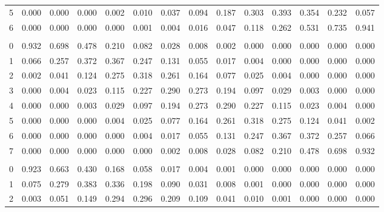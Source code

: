 \documentclass[
]{article}
\begin{document}
\begin{table}[H]
\begin{tabular}{lrrrrrrrrrrrrr}
\hspace{1em}5 & 0.000 & 0.000 & 0.000 & 0.002 & 0.010 & 0.037 & 0.094 & 0.187 & 0.303 & 0.393 & 0.354 & 0.232 & 0.057\\
\hspace{1em}6 & 0.000 & 0.000 & 0.000 & 0.000 & 0.001 & 0.004 & 0.016 & 0.047 & 0.118 & 0.262 & 0.531 & 0.735 & 0.941\\
\addlinespace[0.3em]
\multicolumn{14}{l}{$n=7$}\\
\hspace{1em}0 & 0.932 & 0.698 & 0.478 & 0.210 & 0.082 & 0.028 & 0.008 & 0.002 & 0.000 & 0.000 & 0.000 & 0.000 & 0.000\\
\hspace{1em}1 & 0.066 & 0.257 & 0.372 & 0.367 & 0.247 & 0.131 & 0.055 & 0.017 & 0.004 & 0.000 & 0.000 & 0.000 & 0.000\\
\hspace{1em}2 & 0.002 & 0.041 & 0.124 & 0.275 & 0.318 & 0.261 & 0.164 & 0.077 & 0.025 & 0.004 & 0.000 & 0.000 & 0.000\\
\hspace{1em}3 & 0.000 & 0.004 & 0.023 & 0.115 & 0.227 & 0.290 & 0.273 & 0.194 & 0.097 & 0.029 & 0.003 & 0.000 & 0.000\\
\hspace{1em}4 & 0.000 & 0.000 & 0.003 & 0.029 & 0.097 & 0.194 & 0.273 & 0.290 & 0.227 & 0.115 & 0.023 & 0.004 & 0.000\\
\hspace{1em}5 & 0.000 & 0.000 & 0.000 & 0.004 & 0.025 & 0.077 & 0.164 & 0.261 & 0.318 & 0.275 & 0.124 & 0.041 & 0.002\\
\hspace{1em}6 & 0.000 & 0.000 & 0.000 & 0.000 & 0.004 & 0.017 & 0.055 & 0.131 & 0.247 & 0.367 & 0.372 & 0.257 & 0.066\\
\hspace{1em}7 & 0.000 & 0.000 & 0.000 & 0.000 & 0.000 & 0.002 & 0.008 & 0.028 & 0.082 & 0.210 & 0.478 & 0.698 & 0.932\\
\addlinespace[0.3em]
\multicolumn{14}{l}{$n=8$}\\
\hspace{1em}0 & 0.923 & 0.663 & 0.430 & 0.168 & 0.058 & 0.017 & 0.004 & 0.001 & 0.000 & 0.000 & 0.000 & 0.000 & 0.000\\
\hspace{1em}1 & 0.075 & 0.279 & 0.383 & 0.336 & 0.198 & 0.090 & 0.031 & 0.008 & 0.001 & 0.000 & 0.000 & 0.000 & 0.000\\
\hspace{1em}2 & 0.003 & 0.051 & 0.149 & 0.294 & 0.296 & 0.209 & 0.109 & 0.041 & 0.010 & 0.001 & 0.000 & 0.000 & 0.000\\

\end{tabular}
\end{table}
\end{document}
